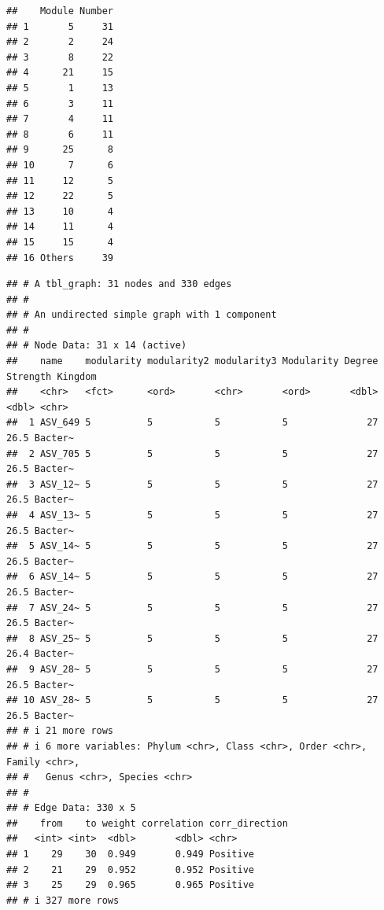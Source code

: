 \documentclass[
]{book}
\newenvironment{Shaded}{\begin{snugshade}}{\end{snugshade}}
\newcommand{\CommentTok}[1]{\textcolor[rgb]{0.56,0.35,0.01}{\textit{#1}}}
\newcommand{\NormalTok}[1]{#1}
\newcommand{\SpecialCharTok}[1]{\textcolor[rgb]{0.81,0.36,0.00}{\textbf{#1}}}
\begin{document}
\begin{Shaded}
\end{Shaded}

\begin{verbatim}
##    Module Number
## 1       5     31
## 2       2     24
## 3       8     22
## 4      21     15
## 5       1     13
## 6       3     11
## 7       4     11
## 8       6     11
## 9      25      8
## 10      7      6
## 11     12      5
## 12     22      5
## 13     10      4
## 14     11      4
## 15     15      4
## 16 Others     39
\end{verbatim}

\begin{Shaded}
\end{Shaded}

\begin{verbatim}
## # A tbl_graph: 31 nodes and 330 edges
## #
## # An undirected simple graph with 1 component
## #
## # Node Data: 31 x 14 (active)
##    name    modularity modularity2 modularity3 Modularity Degree Strength Kingdom
##    <chr>   <fct>      <ord>       <chr>       <ord>       <dbl>    <dbl> <chr>  
##  1 ASV_649 5          5           5           5              27     26.5 Bacter~
##  2 ASV_705 5          5           5           5              27     26.5 Bacter~
##  3 ASV_12~ 5          5           5           5              27     26.5 Bacter~
##  4 ASV_13~ 5          5           5           5              27     26.5 Bacter~
##  5 ASV_14~ 5          5           5           5              27     26.5 Bacter~
##  6 ASV_14~ 5          5           5           5              27     26.5 Bacter~
##  7 ASV_24~ 5          5           5           5              27     26.5 Bacter~
##  8 ASV_25~ 5          5           5           5              27     26.4 Bacter~
##  9 ASV_28~ 5          5           5           5              27     26.5 Bacter~
## 10 ASV_28~ 5          5           5           5              27     26.5 Bacter~
## # i 21 more rows
## # i 6 more variables: Phylum <chr>, Class <chr>, Order <chr>, Family <chr>,
## #   Genus <chr>, Species <chr>
## #
## # Edge Data: 330 x 5
##    from    to weight correlation corr_direction
##   <int> <int>  <dbl>       <dbl> <chr>         
## 1    29    30  0.949       0.949 Positive      
## 2    21    29  0.952       0.952 Positive      
## 3    25    29  0.965       0.965 Positive      
## # i 327 more rows
\end{verbatim}
\end{document}
